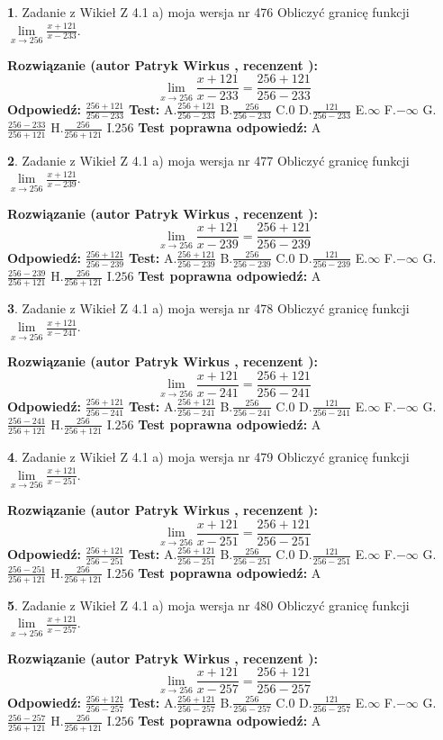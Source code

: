 \documentclass[12pt, a4paper]{article}
\theoremstyle{definition} %
\newtheorem{zad}{}
\newcommand{\zadStart}[1]{\begin{zad}#1\newline}
\newcommand{\zadStop}{\end{zad}}
\newcommand{\rozwStart}[2]{\noindent \textbf{Rozwiązanie (autor #1 , recenzent #2): }\newline}
\newcommand{\rozwStop}{\newline}
\newcommand{\odpStart}{\noindent \textbf{Odpowiedź:}\newline}
\newcommand{\odpStop}{\newline}
\newcommand{\testStart}{\noindent \textbf{Test:}\newline}
\newcommand{\testStop}{\newline}
\newcommand{\kluczStart}{\noindent \textbf{Test poprawna odpowiedź:}\newline}
\newcommand{\kluczStop}{\newline}
\begin{document}
\zadStart{Zadanie z Wikieł Z 4.1 a) moja wersja nr 476}
Obliczyć granicę funkcji $\lim\limits_{x\to256}\frac{x+121}{x-233}$.
\zadStop
\rozwStart{Patryk Wirkus}{}
$$\lim\limits_{x\to256}\frac{x+121}{x-233} = \frac{256+121}{256-233}$$
\rozwStop
\odpStart
$\frac{256+121}{256-233}$
\odpStop
\testStart
A.$\frac{256+121}{256-233}$
B.$\frac{256}{256-233}$
C.$0$
D.$\frac{121}{256-233}$
E.$\infty$
F.$-\infty$
G.$\frac{256-233}{256+121}$
H.$\frac{256}{256+121}$
I.$256$
\testStop
\kluczStart
A
\kluczStop



\zadStart{Zadanie z Wikieł Z 4.1 a) moja wersja nr 477}
Obliczyć granicę funkcji $\lim\limits_{x\to256}\frac{x+121}{x-239}$.
\zadStop
\rozwStart{Patryk Wirkus}{}
$$\lim\limits_{x\to256}\frac{x+121}{x-239} = \frac{256+121}{256-239}$$
\rozwStop
\odpStart
$\frac{256+121}{256-239}$
\odpStop
\testStart
A.$\frac{256+121}{256-239}$
B.$\frac{256}{256-239}$
C.$0$
D.$\frac{121}{256-239}$
E.$\infty$
F.$-\infty$
G.$\frac{256-239}{256+121}$
H.$\frac{256}{256+121}$
I.$256$
\testStop
\kluczStart
A
\kluczStop



\zadStart{Zadanie z Wikieł Z 4.1 a) moja wersja nr 478}
Obliczyć granicę funkcji $\lim\limits_{x\to256}\frac{x+121}{x-241}$.
\zadStop
\rozwStart{Patryk Wirkus}{}
$$\lim\limits_{x\to256}\frac{x+121}{x-241} = \frac{256+121}{256-241}$$
\rozwStop
\odpStart
$\frac{256+121}{256-241}$
\odpStop
\testStart
A.$\frac{256+121}{256-241}$
B.$\frac{256}{256-241}$
C.$0$
D.$\frac{121}{256-241}$
E.$\infty$
F.$-\infty$
G.$\frac{256-241}{256+121}$
H.$\frac{256}{256+121}$
I.$256$
\testStop
\kluczStart
A
\kluczStop



\zadStart{Zadanie z Wikieł Z 4.1 a) moja wersja nr 479}
Obliczyć granicę funkcji $\lim\limits_{x\to256}\frac{x+121}{x-251}$.
\zadStop
\rozwStart{Patryk Wirkus}{}
$$\lim\limits_{x\to256}\frac{x+121}{x-251} = \frac{256+121}{256-251}$$
\rozwStop
\odpStart
$\frac{256+121}{256-251}$
\odpStop
\testStart
A.$\frac{256+121}{256-251}$
B.$\frac{256}{256-251}$
C.$0$
D.$\frac{121}{256-251}$
E.$\infty$
F.$-\infty$
G.$\frac{256-251}{256+121}$
H.$\frac{256}{256+121}$
I.$256$
\testStop
\kluczStart
A
\kluczStop



\zadStart{Zadanie z Wikieł Z 4.1 a) moja wersja nr 480}
Obliczyć granicę funkcji $\lim\limits_{x\to256}\frac{x+121}{x-257}$.
\zadStop
\rozwStart{Patryk Wirkus}{}
$$\lim\limits_{x\to256}\frac{x+121}{x-257} = \frac{256+121}{256-257}$$
\rozwStop
\odpStart
$\frac{256+121}{256-257}$
\odpStop
\testStart
A.$\frac{256+121}{256-257}$
B.$\frac{256}{256-257}$
C.$0$
D.$\frac{121}{256-257}$
E.$\infty$
F.$-\infty$
G.$\frac{256-257}{256+121}$
H.$\frac{256}{256+121}$
I.$256$
\testStop
\kluczStart
A
\kluczStop
\end{document}
